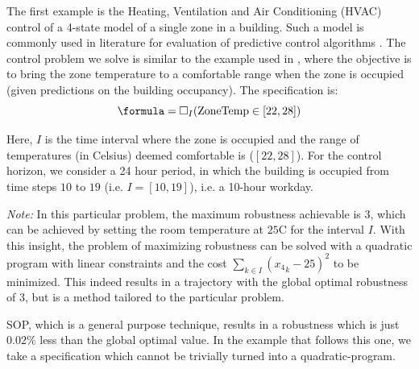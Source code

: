 
The first example is the Heating, Ventilation and Air Conditioning (HVAC) control of a 4-state model of a single zone in a building. Such a model is commonly used in literature for evaluation of predictive control algorithms \cite{Jain2016}. The control problem we solve is similar to the example used in \cite{Raman14_MPCSTL}, where the objective is to bring the zone temperature to a comfortable range when the zone is occupied (given predictions on the building occupancy). The specification is:
\begin{equation}
\label{eq:BldgSpec}
\formula = \always_I(\text{ZoneTemp} \in [22,28])
\end{equation}

Here, $I$ is the time interval where the zone is occupied and the range of temperatures (in Celsius) deemed comfortable is ($[22,28]$). For the control horizon, we consider a 24 hour period, in which the building is occupied from time steps $10$ to $19$ (i.e. $I=[10,19]$), i.e. a 10-hour workday. 

\textit{Note:} In this particular problem, the maximum robustness achievable is $3$, which can be achieved by setting the room temperature at $25$C for the interval $I$. 
With this insight, the problem of maximizing robustness can be solved with a quadratic program with linear constraints and the cost $\sum_{k \in I}({x_4}_k-25)^2$ to be minimized. This indeed results in a trajectory with the global optimal robustness of $3$, but is a method tailored to the particular problem. 

SOP, which is a general purpose technique, results in a robustness which is just $0.02\%$ less than the global optimal value. In the example that follows this one, we take a specification which cannot be trivially turned into a quadratic-program.


